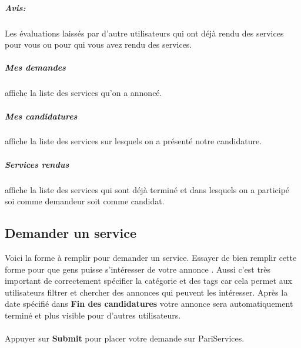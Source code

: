 \subparagraph{Avis:} Les évaluations laissés par d'autre utilisateurs qui ont déjà rendu des services pour vous ou pour qui vous avez rendu des services.

\subparagraph{Mes demandes} affiche la liste des services qu'on a annoncé.

\subparagraph{Mes candidatures} affiche la liste des services sur lesquels on a présenté  notre candidature.
\subparagraph{Services rendus} affiche la liste des services qui sont déjà terminé et dans lesquels on a participé soi comme demandeur soit comme candidat.

\subsection{Demander un service}
\begin{minipage}{0.50\textwidth}
	Voici la forme à remplir pour demander un service. Essayer de bien remplir cette forme pour que gens puisse s'intéresser de votre annonce . Aussi c'est très important de correctement spécifier la catégorie et des tags car cela permet aux utilisateurs filtrer et chercher des annonces qui peuvent les intéresser. Après la date spécifié dans \textbf{Fin des candidatures} votre annonce sera automatiquement terminé et plus visible pour d'autres utilisateurs.
	\indent\paragraph{} Appuyer  sur \textbf{Submit} pour placer votre demande sur PariServices.
\end{minipage} \hfill

